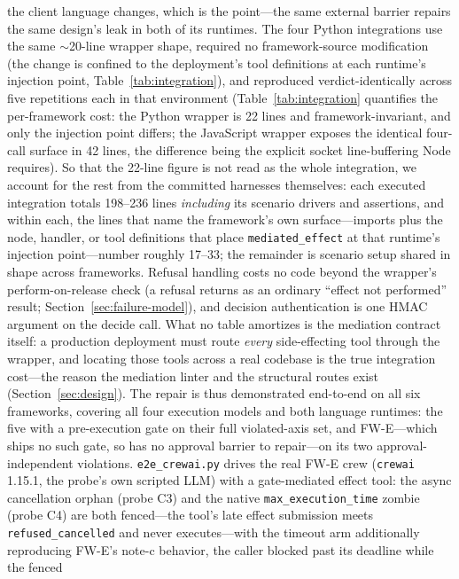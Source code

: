 \documentclass[10pt,journal,compsoc]{IEEEtran}
\begin{document}
the client language changes, which is the point---the same external barrier
repairs the same design's leak in both of its runtimes.
The four Python integrations use the same ${\sim}$20-line wrapper
shape, required no framework-source modification (the change is confined to
the deployment's tool definitions at each runtime's injection point,
Table~\ref{tab:integration}), and reproduced verdict-identically
across five repetitions each in that environment
(Table~\ref{tab:integration} quantifies the per-framework cost: the Python wrapper is
22 lines and framework-invariant, and only the injection point differs; the
JavaScript wrapper exposes the identical four-call surface in 42 lines, the
difference being the explicit socket line-buffering Node requires). So that
the 22-line figure is not read as the whole integration, we account for the
rest from the committed harnesses themselves: each executed integration
totals 198--236 lines \emph{including} its scenario drivers and assertions,
and within each, the lines that name the framework's own surface---imports
plus the node, handler, or tool definitions that place
\texttt{mediated\_effect} at that runtime's injection point---number roughly
17--33; the remainder is scenario setup shared in shape across frameworks.
Refusal handling costs no code beyond the wrapper's perform-on-release check
(a refusal returns as an ordinary ``effect not performed'' result;
Section~\ref{sec:failure-model}), and decision authentication is one HMAC
argument on the decide call. What no table amortizes is the mediation
contract itself: a production deployment must route \emph{every}
side-effecting tool through the wrapper, and locating those tools across a
real codebase is the true integration cost---the reason the mediation linter
and the structural routes exist (Section~\ref{sec:design}). The repair is thus
demonstrated end-to-end on all six frameworks, covering all four execution
models and both language runtimes: the five with a pre-execution gate on
their full violated-axis set, and \textsf{FW-E}---which ships no such gate,
so has no approval barrier to repair---on its two approval-independent
violations. \texttt{e2e\_crewai.py} drives the real \textsf{FW-E} crew
(\texttt{crewai} 1.15.1, the probe's own scripted LLM) with a gate-mediated
effect tool: the async cancellation orphan (probe C3) and the native
\texttt{max\_execution\_time} zombie (probe C4) are both fenced---the tool's
late effect submission meets \texttt{refused\_cancelled} and never
executes---with the timeout arm additionally reproducing \textsf{FW-E}'s
note-c behavior, the caller blocked past its deadline while the fenced
\end{document}
